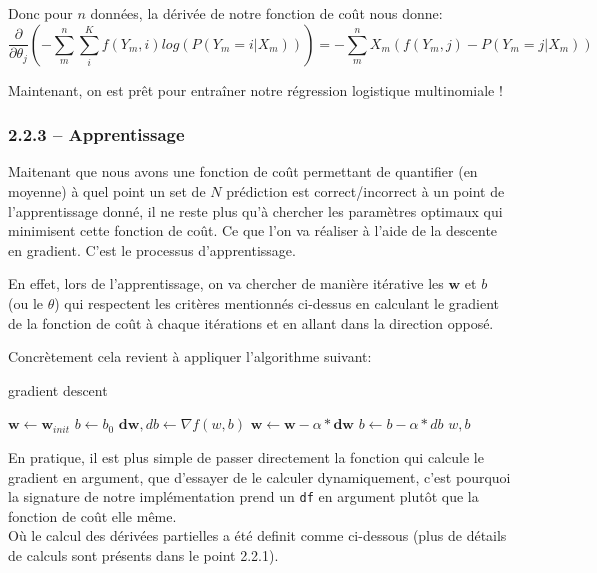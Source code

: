 \documentclass[
]{article}
\begin{document}
Donc pour \(n\) données, la dérivée de notre fonction de coût nous
donne:
\[\frac{\partial}{\partial \theta_{j}} \left( - \sum_m^n \sum_i^K f(Y_m, i)log(P(Y_m = i | X_m))\right) = - \sum_m^n X_m(f(Y_m, j) - P(Y_m = j|X_m))\]

Maintenant, on est prêt pour entraîner notre régression logistique
multinomiale !

\newpage

\subsubsection{2.2.3 -- Apprentissage}\label{apprentissage}

Maitenant que nous avons une fonction de coût permettant de quantifier
(en moyenne) à quel point un set de \(N\) prédiction est
correct/incorrect à un point de l'apprentissage donné, il ne reste plus
qu'à chercher les paramètres optimaux qui minimisent cette fonction de
coût. Ce que l'on va réaliser à l'aide de la descente en gradient. C'est
le processus d'apprentissage.

En effet, lors de l'apprentissage, on va chercher de manière itérative
les \(\mathbf{w}\) et \(b\) (ou le \(\theta\)) qui respectent les
critères mentionnés ci-dessus en calculant le gradient de la fonction de
coût à chaque itérations et en allant dans la direction opposé.

Concrètement cela revient à appliquer l'algorithme suivant:

\begin{algorithm}
\caption{gradient descent}\label{alg:grad_desc}
\begin{algorithmic}
\State $\mathbf{w}\gets \mathbf{w}_{init}$
\State $b \gets b_0$
    \State $\mathbf{dw}, db \gets \nabla{f(w, b)} $
    \State $\mathbf{w}\gets \mathbf{w}- \alpha*\mathbf{dw}$
    \State $b \gets b - \alpha*db$
\EndFor
\State \Return $w, b$
\EndFunction
\end{algorithmic}
\end{algorithm}

En pratique, il est plus simple de passer directement la fonction qui
calcule le gradient en argument, que d'essayer de le calculer
dynamiquement, c'est pourquoi la signature de notre implémentation prend
un \texttt{df} en argument plutôt que la fonction de coût elle même.\\
Où le calcul des dérivées partielles a été definit comme ci-dessous
(plus de détails de calculs sont présents dans le point 2.2.1).
\end{document}
